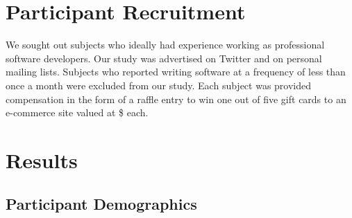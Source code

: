 \section{Participant Recruitment}
\label{sec:Recruitment}

We sought out subjects who ideally had experience working as professional
software developers.
Our study was advertised on Twitter and on personal mailing lists.
Subjects who reported writing software at a frequency of less than once a month 
were excluded from our study.
Each subject was provided compensation in the form of a raffle entry to win
one out of five gift cards to an e-commerce site valued at \$\cardamount{} each.

\section{Results}
\label{sec:Results}

\subsection{Participant Demographics}
\label{subsec:Demographics}

\endinput
